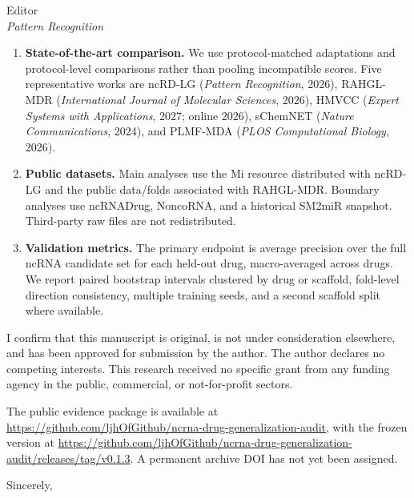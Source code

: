 \documentclass[11pt]{letter}
\begin{document}
\begin{letter}{Editor\\\textit{Pattern Recognition}}
\begin{enumerate}
  \item \textbf{State-of-the-art comparison.} We use protocol-matched adaptations and protocol-level comparisons rather than pooling incompatible scores. Five representative works are ncRD-LG (\textit{Pattern Recognition}, 2026), RAHGL-MDR (\textit{International Journal of Molecular Sciences}, 2026), HMVCC (\textit{Expert Systems with Applications}, 2027; online 2026), sChemNET (\textit{Nature Communications}, 2024), and PLMF-MDA (\textit{PLOS Computational Biology}, 2026).
  \item \textbf{Public datasets.} Main analyses use the Mi resource distributed with ncRD-LG and the public data/folds associated with RAHGL-MDR. Boundary analyses use ncRNADrug, NoncoRNA, and a historical SM2miR snapshot. Third-party raw files are not redistributed.
  \item \textbf{Validation metrics.} The primary endpoint is average precision over the full ncRNA candidate set for each held-out drug, macro-averaged across drugs. We report paired bootstrap intervals clustered by drug or scaffold, fold-level direction consistency, multiple training seeds, and a second scaffold split where available.
\end{enumerate}

I confirm that this manuscript is original, is not under consideration elsewhere, and has been approved for submission by the author. The author declares no competing interests. This research received no specific grant from any funding agency in the public, commercial, or not-for-profit sectors.

The public evidence package is available at \url{https://github.com/ljhOfGithub/ncrna-drug-generalization-audit}, with the frozen version at \url{https://github.com/ljhOfGithub/ncrna-drug-generalization-audit/releases/tag/v0.1.3}. A permanent archive DOI has not yet been assigned.

\closing{Sincerely,}
\end{letter}
\end{document}
